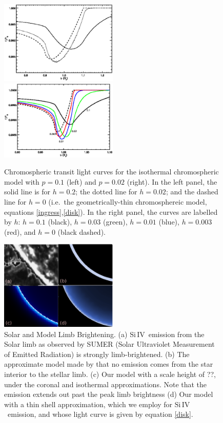 \documentclass[manuscript]{aastex}
\newcommand{\siIV}{\ensuremath{\mathrm{Si}\,\scriptstyle \mathrm{IV}}}
\begin{document}
\begin{figure}

\includegraphics[width=0.5\textwidth]{lc_h.1_p.1.eps}
\includegraphics[width=0.5\textwidth]{plot_3d_p.02.eps}
\caption{Chromospheric transit light curves for the
isothermal chromospheric model with $p=0.1$ (left) and
$p=0.02$ (right).   In the left panel, the
solid line is for $h=0.2$; the dotted line for $h=0.02$;
and the dashed line for $h=0$ (i.e.\ the geometrically-thin
chromosphereic model, equations \ref{ingress},\ref{disk}).
In the right panel, the curves are labelled by $h$:
$h=0.1$ (black), $h=0.03$ (green), $h=0.01$ (blue),
$h=0.003$ (red), and $h=0$ (black dashed).}
\label{fig04}
\end{figure}


\begin{figure}
\begin{center}
\includegraphics[width=0.5\textwidth]{limb_comparison_w_simplistic.eps}
\caption{Solar and Model Limb Brightening. (a) \siIV\ emission from the Solar limb as observed by SUMER (Solar Ultraviolet Measurement of Emitted Radiation) \citep{wiik} is strongly limb-brightened. (b) The approximate model made by \citet{assef} that no emission comes from the star interior to the stellar limb. (c) Our model with a scale height of ??, under the coronal and isothermal approximations. Note that the emission extends out past the peak limb brightness (d) Our model with a thin shell approximation, which we employ for \siIV\ emission, and whose light curve is given by  equation \ref{disk}.}
\label{limbs}
\end{center}
\end{figure}
\end{document}
